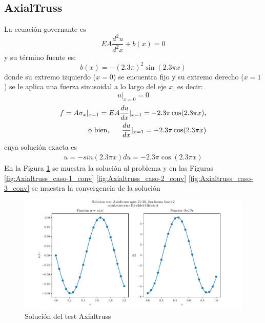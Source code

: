 \subsection{AxialTruss}
La ecuación governante es
\begin{equation}
    E A \frac{d^2 u}{d^2 x} + b(x) = 0
\end{equation}
y su término fuente es:
\begin{equation}
    b(x) = -(2.3 \pi)^2 \sin(2.3\pi x)
\end{equation}
donde su extremo izquierdo ($x=0$) se encuentra fijo y su extremo derecho ($x=1$) se le aplica una fuerza sinusoidal a lo largo del eje $x$, es decir:
\begin{equation}
    u|_{x=0} = 0
\end{equation}
\begin{equation}
    \begin{split}
        f = A \sigma_x|_{x=1} = E A \frac{d u}{d x} |_{x=1} = -2.3 \pi \cos(2.3 \pi x) , \\
        \mbox{ o bien, } \hspace{0.5cm} \frac{d u}{d x} |_{x=1} = -2.3 \pi \cos(2.3 \pi x)
    \end{split}
\end{equation}
cuya solución exacta es
\begin{eqnarray}
    u = -sin( 2.3 \pi x ) 
    du = - 2.3 \pi \cos( 2.3 \pi x )
\end{eqnarray}
En la Figura \ref{fig:Axialtruss_caso-1_sol} se muestra la solución al problema y en las Figuras \ref{fig:Axialtruss_caso-1_conv} \ref{fig:Axialtruss_caso-2_conv} \ref{fig:Axialtruss_caso-3_conv} se muestra la convergencia de la solución
\begin{figure}
    \centering
    \includegraphics[width=1\textwidth]{./Imagenes/06/solucion/Axialtruss_21-20_regular_type-2_caso-1_lme-v2_direct_dgesv-lapack-blas.pdf}
    \caption{Solución del test Axialtruss} \label{fig:Axialtruss_caso-1_sol}
\end{figure}
